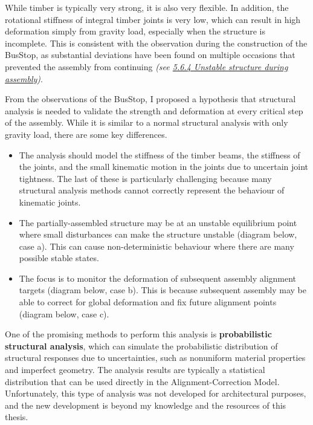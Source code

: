 While timber is typically very strong, it is also very flexible. In addition, the rotational stiffness of integral timber joints is very low, which can result in high deformation simply from gravity load, especially when the structure is incomplete. This is consistent with the observation during the construction of the BusStop, as substantial deviations have been found on multiple occasions that prevented the assembly from continuing \textit{(see \ul{5.6.4 Unstable structure during assembly})}. 

From the observations of the BusStop, I proposed a hypothesis that structural analysis is needed to validate the strength and deformation at every critical step of the assembly. While it is similar to a normal structural analysis with only gravity load, there are some key differences. 

\begin{itemize}
	\item The analysis should model the stiffness of the timber beams, the stiffness of the joints, and the small kinematic motion in the joints due to uncertain joint tightness. The last of these is particularly challenging because many structural analysis methods cannot correctly represent the behaviour of kinematic joints. 

	\item The partially-assembled structure may be at an unstable equilibrium point where small disturbances can make the structure unstable (diagram below, case a). This can cause non-deterministic behaviour where there are many possible stable states.

	\item The focus is to monitor the deformation of subsequent assembly alignment targets (diagram below, case b). This is because subsequent assembly may be able to correct for global deformation and fix future alignment points (diagram below, case c).

\end{itemize}



One of the promising methods to perform this analysis is \textbf{probabilistic structural analysis}, which can simulate the probabilistic distribution of structural responses due to uncertainties, such as nonuniform material properties and imperfect geometry\parencite{cruseProbabilisticStructuralAnalysis1988, kohlerProbabilisticModelingTimber2007}. The analysis results are typically a statistical distribution that can be used directly in the Alignment-Correction Model. Unfortunately, this type of analysis was not developed for architectural purposes, and the new development is beyond my knowledge and the resources of this thesis. 

